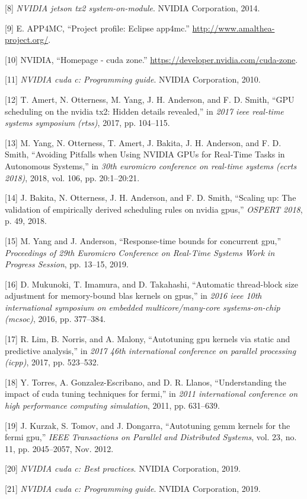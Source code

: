 \documentclass[
  12pt,
  a4paperpaper,
]{report}
\begin{document}
\leavevmode\hypertarget{ref-TX2Datasheet2014}{}%
{[}8{]} \emph{NVIDIA jetson tx2 system-on-module}. NVIDIA Corporation,
2014.

\leavevmode\hypertarget{ref-Amalthea2019}{}%
{[}9{]} E. APP4MC, ``Project profile: Eclipse app4mc.''
\url{http://www.amalthea-project.org/}.

\leavevmode\hypertarget{ref-CUDAZONE2019}{}%
{[}10{]} NVIDIA, ``Homepage - cuda zone.''
\url{https://developer.nvidia.com/cuda-zone}.

\leavevmode\hypertarget{ref-CCUDA2010}{}%
{[}11{]} \emph{NVIDIA cuda c: Programming guide}. NVIDIA Corporation,
2010.

\leavevmode\hypertarget{ref-amert2017gpu}{}%
{[}12{]} T. Amert, N. Otterness, M. Yang, J. H. Anderson, and F. D.
Smith, ``GPU scheduling on the nvidia tx2: Hidden details revealed,'' in
\emph{2017 ieee real-time systems symposium (rtss)}, 2017, pp. 104--115.

\leavevmode\hypertarget{ref-yang2018}{}%
{[}13{]} M. Yang, N. Otterness, T. Amert, J. Bakita, J. H. Anderson, and
F. D. Smith, ``Avoiding Pitfalls when Using NVIDIA GPUs for Real-Time
Tasks in Autonomous Systems,'' in \emph{30th euromicro conference on
real-time systems (ecrts 2018)}, 2018, vol. 106, pp. 20:1--20:21.

\leavevmode\hypertarget{ref-bakita2018scaling}{}%
{[}14{]} J. Bakita, N. Otterness, J. H. Anderson, and F. D. Smith,
``Scaling up: The validation of empirically derived scheduling rules on
nvidia gpus,'' \emph{OSPERT 2018}, p. 49, 2018.

\leavevmode\hypertarget{ref-yang2019}{}%
{[}15{]} M. Yang and J. Anderson, ``Response-time bounds for concurrent
gpu,'' \emph{Proceedings of 29th Euromicro Conference on Real-Time
Systems Work in Progress Session}, pp. 13--15, 2019.

\leavevmode\hypertarget{ref-Mukunoki2016}{}%
{[}16{]} D. Mukunoki, T. Imamura, and D. Takahashi, ``Automatic
thread-block size adjustment for memory-bound blas kernels on gpus,'' in
\emph{2016 ieee 10th international symposium on embedded
multicore/many-core systems-on-chip (mcsoc)}, 2016, pp. 377--384.

\leavevmode\hypertarget{ref-Lim2017}{}%
{[}17{]} R. Lim, B. Norris, and A. Malony, ``Autotuning gpu kernels via
static and predictive analysis,'' in \emph{2017 46th international
conference on parallel processing (icpp)}, 2017, pp. 523--532.

\leavevmode\hypertarget{ref-Torres2011}{}%
{[}18{]} Y. Torres, A. Gonzalez-Escribano, and D. R. Llanos,
``Understanding the impact of cuda tuning techniques for fermi,'' in
\emph{2011 international conference on high performance computing
simulation}, 2011, pp. 631--639.

\leavevmode\hypertarget{ref-Kurzak2012}{}%
{[}19{]} J. Kurzak, S. Tomov, and J. Dongarra, ``Autotuning gemm kernels
for the fermi gpu,'' \emph{IEEE Transactions on Parallel and Distributed
Systems}, vol. 23, no. 11, pp. 2045--2057, Nov. 2012.

\leavevmode\hypertarget{ref-CCUDA20192}{}%
{[}20{]} \emph{NVIDIA cuda c: Best practices}. NVIDIA Corporation, 2019.

\leavevmode\hypertarget{ref-CCUDA2019}{}%
{[}21{]} \emph{NVIDIA cuda c: Programming guide}. NVIDIA Corporation,
2019.
\end{document}
